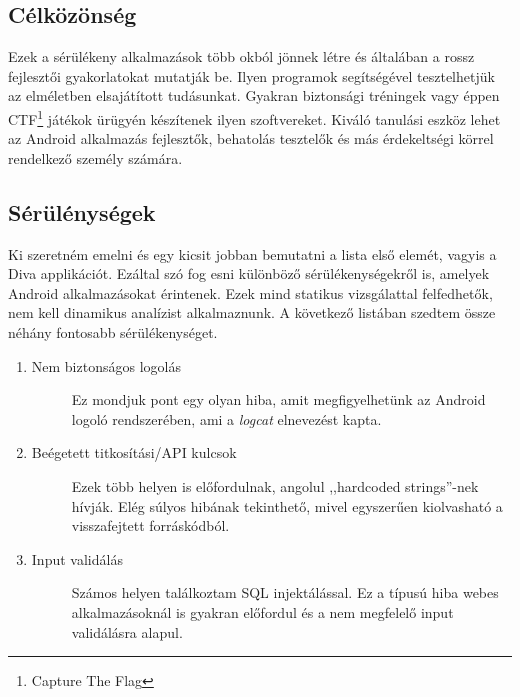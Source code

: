 \documentclass{thesis-ekf}
\theoremstyle{definition}
\theoremstyle{remark}
\begin{document}
\subsection{Célközönség}

Ezek a sérülékeny alkalmazások több okból jönnek létre és általában a rossz fejlesztői gyakorlatokat mutatják be.
Ilyen programok segítségével tesztelhetjük az elméletben elsajátított tudásunkat.
Gyakran biztonsági tréningek vagy éppen CTF\footnote{Capture The Flag} játékok ürügyén készítenek ilyen szoftvereket.
Kiváló tanulási eszköz lehet az Android alkalmazás fejlesztők, behatolás tesztelők és más érdekeltségi körrel rendelkező személy számára.

\subsection{Sérülénységek}

Ki szeretném emelni és egy kicsit jobban bemutatni a lista első elemét, vagyis a Diva applikációt.
Ezáltal szó fog esni különböző sérülékenységekről is, amelyek Android alkalmazásokat érintenek.
Ezek mind statikus vizsgálattal felfedhetők, nem kell dinamikus analízist alkalmaznunk.
A következő listában szedtem össze néhány fontosabb sérülékenységet.

\begin{enumerate}
	\item
	\begin{description}
		\item[Nem biztonságos logolás] Ez mondjuk pont egy olyan hiba, amit megfigyelhetünk az Android logoló rendszerében, ami a \emph{logcat} elnevezést kapta.
	\end{description}
	\item
	\begin{description}
		\item [Beégetett titkosítási/API kulcsok] Ezek több helyen is előfordulnak, angolul ,,hardcoded strings''-nek hívják. Elég súlyos hibának tekinthető, mivel egyszerűen kiolvasható a visszafejtett forráskódból.
	\end{description}
	\item
	\begin{description}
		\item [Input validálás] Számos helyen találkoztam SQL injektálással. Ez a típusú hiba webes alkalmazásoknál is gyakran előfordul és a nem megfelelő input validálásra alapul.
	\end{description}
\end{enumerate}
\end{document}
